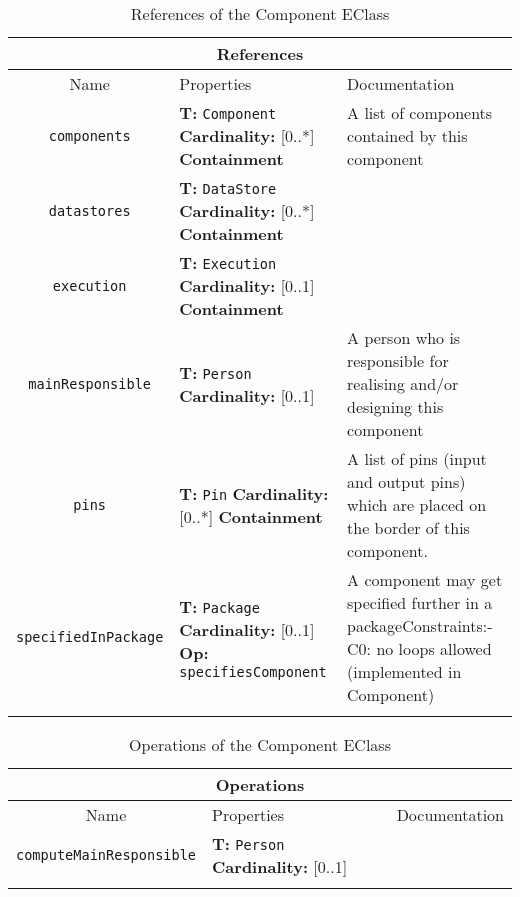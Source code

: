 \documentclass{article}
\begin{document}
\begin{table}[H]
\footnotesize
\begin{tabularx}{\textwidth}{|c| p{4 cm} | X |}
\hline
\multicolumn{3}{|c|}{\textbf{References}} \\
\hline
Name & Properties & Documentation \\ \hline \hline
\texttt{components}
 & 
\textbf{T:} \texttt{Component}
\newline
\textbf{Cardinality:} [0..*]
\newline
\textbf{Containment}
 & A list of components contained by this component\\ \hline
\texttt{datastores}
 & 
\textbf{T:} \texttt{DataStore}
\newline
\textbf{Cardinality:} [0..*]
\newline
\textbf{Containment}
 & \\ \hline
\texttt{execution}
 & 
\textbf{T:} \texttt{Execution}
\newline
\textbf{Cardinality:} [0..1]
\newline
\textbf{Containment}
 & \\ \hline
\texttt{mainResponsible}
 & 
\textbf{T:} \texttt{Person}
\newline
\textbf{Cardinality:} [0..1]
 & A person who is responsible for realising and/or designing this component\\ \hline
\texttt{pins}
 & 
\textbf{T:} \texttt{Pin}
\newline
\textbf{Cardinality:} [0..*]
\newline
\textbf{Containment}
 & A list of pins (input and output pins) which are placed on the border of this component.\\ \hline
\texttt{specifiedInPackage}
 & 
\textbf{T:} \texttt{Package}
\newline
\textbf{Cardinality:} [0..1]
\newline
\textbf{Op:} \texttt{specifiesComponent}
 & A component may get specified further in a packageConstraints:- C0: no loops allowed (implemented in Component)\\ \hline
\caption{References of the Component EClass}
\end{tabularx}
\label{e4smComponentref}
\end{table}
\begin{table}[H]
\footnotesize
\begin{tabularx}{\textwidth}{|c| p{4 cm} | X |}
\hline
\multicolumn{3}{|c|}{\textbf{Operations}} \\
\hline
Name & Properties & Documentation \\ \hline \hline
\texttt{computeMainResponsible}
 & 
\textbf{T:} \texttt{Person}
\newline
\textbf{Cardinality:} [0..1]
 & \\ \hline
\caption{Operations of the Component EClass}
\end{tabularx}
\label{e4smComponentop}
\end{table}
\end{document}
